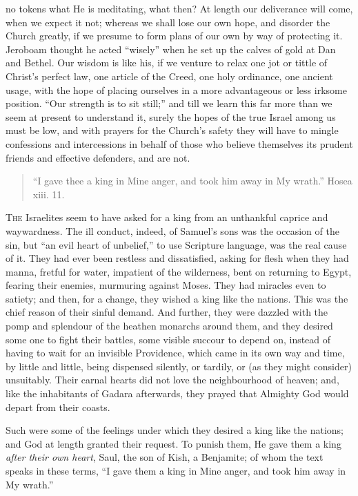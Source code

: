 no tokens what He is meditating, what then? At length our deliverance
will come, when we expect it not; whereas we shall lose our own hope,
and disorder the Church greatly, if we presume to form plans of our
own by way of protecting it. Jeroboam thought he acted
``wisely'' when he set up the calves of gold at Dan and
Bethel. Our wisdom is like his, if we venture to relax one jot or
tittle of Christ's perfect law, one article of the Creed, one holy
ordinance, one ancient usage, with the hope of placing ourselves in a
more advantageous or less irksome position. ``Our strength is to
sit still;'' and till we learn this far more than we seem at
present to understand it, surely the hopes of the true Israel among us
must be low, and with prayers for the Church's safety they will have
to mingle confessions and intercessions in behalf of those who believe
themselves its prudent friends and effective defenders, and are not.


\begin{quote}

``I gave thee a king in Mine anger, and took him away in My
wrath.'' Hosea xiii. 11.

\end{quote}

T\textsc{he} Israelites seem to have asked for a king from an unthankful
caprice and waywardness. The ill conduct, indeed, of Samuel's sons
was the occasion of the sin, but ``an evil heart of
unbelief,'' to use Scripture language, was the real cause of it.
They had ever been restless and dissatisfied, asking for flesh when
they had manna, fretful for water, impatient of the wilderness, bent
on returning to Egypt, fearing their enemies, murmuring against Moses.
They had miracles even to satiety; and then, for a change, they wished
a king like the nations. This was the chief reason of their sinful
demand. And further, they were dazzled with the pomp and splendour of
the heathen monarchs around them, and they desired some one to fight
their battles, some visible succour to depend on, instead of having to
wait for an invisible Providence, which came in its own way and time,
by little and little, being dispensed silently, or tardily, or (as
they might consider) unsuitably. Their carnal hearts did not love the
neighbourhood of heaven; and, like the inhabitants of Gadara
afterwards, they prayed that Almighty God would depart from their
coasts.

Such were some of the feelings under which they desired a king like
the nations; and God at length granted their request. To punish them,
He gave them a king \emph{after their own heart}, Saul, the son of
Kish, a Benjamite; of whom the text speaks in these terms, ``I
gave them a king in Mine anger, and took him away in My wrath.''

